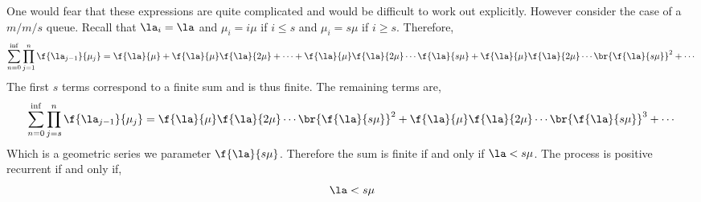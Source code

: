 \documentclass{article}
\begin{document}
    One would fear that these expressions are quite complicated and would be difficult to work out explicitly. However consider the case of a $m/m/s$ queue. Recall that $\la_i = \la$ and $\mu_i = i \mu$ if $i \leq s$ and $\mu_i = s \mu$ if $i \geq s$. Therefore,
    \[ \sum_{n=0}^{\inf} \prod_{j=1}^{n}\f{\la_{j-1}}{\mu_j} = \f{\la}{\mu} + \f{\la}{\mu} \f{\la}{2\mu} + \cdots + \f{\la}{\mu}\f{\la}{2\mu}\cdots \f{\la}{s\mu} + \f{\la}{\mu}\f{\la}{2\mu}\cdots \br{\f{\la}{s\mu}}^2 +\cdots \]
    The first $s$ terms correspond to a finite sum and is thus finite. The remaining terms are,
    \[ \sum_{n=0}^{\inf} \prod_{j=s}^{n}\f{\la_{j-1}}{\mu_j} = \f{\la}{\mu}\f{\la}{2\mu}\cdots \br{\f{\la}{s\mu}}^2 + \f{\la}{\mu}\f{\la}{2\mu}\cdots \br{\f{\la}{s\mu}}^3 + \cdots \]
    Which is a geometric series we parameter $\f{\la}{s\mu}$. Therefore the sum is finite if and only if $\la < s \mu$. The process is positive recurrent if and only if,
    \[ \la < s \mu \]
\end{document}
